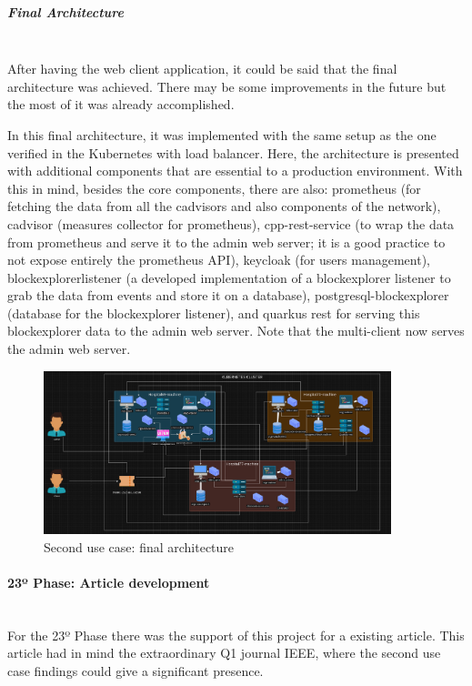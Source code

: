 \subparagraph{Final Architecture}\mbox{}\\
After having the web client application, it could be said that the final architecture was achieved. There may be some improvements in the future but the most of it was already accomplished.

In this final architecture, it was implemented with the same setup as the one verified in the Kubernetes with load balancer. Here, the architecture is presented with additional components that are essential to a production environment. With this in mind, besides the core components, there are also: prometheus (for fetching the data from all the cadvisors and also components of the network), cadvisor (measures collector for prometheus), cpp-rest-service (to wrap the data from prometheus and serve it to the admin web server; it is a good practice to not expose entirely the prometheus API), keycloak (for users management), blockexplorerlistener (a developed implementation of a blockexplorer listener to grab the data from events and store it on a database), postgresql-blockexplorer (database for the blockexplorer listener), and quarkus rest for serving this blockexplorer data to the admin web server. Note that the multi-client now serves the admin web server.

\begin{figure}[H]
    \centering
    \includegraphics[width=0.9\textwidth]{assets/use-case-2/final-arch.png} %
    \caption{Second use case: final architecture}
    \label{fig:sample-image} 
\end{figure}

\paragraph{23º Phase: Article development}\mbox{}\\
For the 23º Phase there was the support of this project for a existing article. This article had in mind the extraordinary Q1 journal IEEE, where the second use case findings could give a significant presence.

